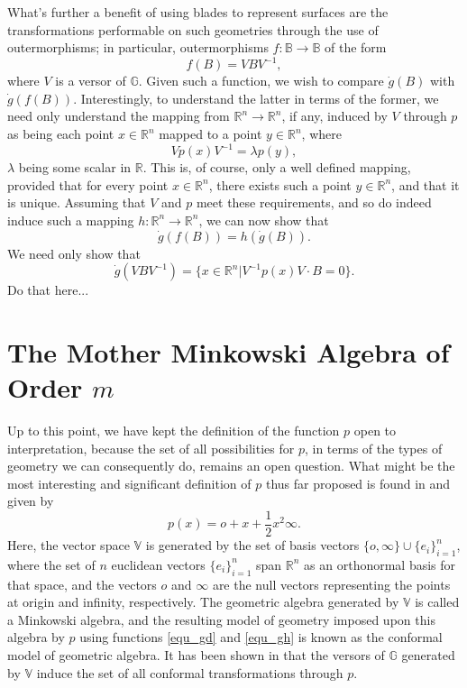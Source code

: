 \documentclass{ecgd-l}
\theoremstyle{definition}
\theoremstyle{remark}
\numberwithin{equation}{section}
\newcommand{\R}{\mathbb{R}}
\newcommand{\B}{\mathbb{B}}
\newcommand{\G}{\mathbb{G}}
\newcommand{\V}{\mathbb{V}}
\newcommand{\gd}{\dot{g}}
\newcommand{\nvai}{\infty}
\newcommand{\nvao}{o}
\begin{document}
What's further a benefit of using blades to represent surfaces are the transformations
performable on such geometries through the use of outermorphisms; in particular,
outermorphisms $f:\B\to\B$ of the form
\begin{equation*}
f(B) = VBV^{-1},
\end{equation*}
where $V$ is a versor of $\G$.  Given such a function, we wish to
compare $\gd(B)$ with $\gd(f(B))$.  Interestingly, to understand
the latter in terms of the former, we need only understand the mapping from $\R^n\to\R^n$,
if any, induced by $V$ through $p$ as being each point $x\in\R^n$ mapped to a point
$y\in\R^n$, where
\begin{equation*}
Vp(x)V^{-1}=\lambda p(y),
\end{equation*}
$\lambda$ being some scalar in $\R$.
This is, of course, only a well defined mapping, provided that for every point $x\in\R^n$, there exists
such a point $y\in\R^n$, and that it is unique.
Assuming that $V$ and $p$ meet these requirements, and so do indeed induce
such a mapping $h:\R^n\to\R^n$, we can now show that
\begin{equation*}
\gd(f(B)) = h(\gd(B)).
\end{equation*}
We need only show that
\begin{equation*}
\gd(VBV^{-1})=\{x\in\R^n|V^{-1}p(x)V\cdot B=0\}.
\end{equation*}
Do that here...

\section{The Mother Minkowski Algebra of Order $m$}

Up to this point, we have kept the definition of the function $p$
open to interpretation, because the set of all possibilities for $p$, in terms of the types of geometry
we can consequently do, remains an open question.  What might be the most interesting and significant
definition of $p$ thus far proposed is found in \cite{} and given by
\begin{equation*}
p(x)=\nvao + x + \frac{1}{2}x^2\nvai.
\end{equation*}
Here, the vector space $\V$ is generated by the set
of basis vectors $\{\nvao,\nvai\}\cup\{e_i\}_{i=1}^n$,
where the set of $n$ euclidean vectors $\{e_i\}_{i=1}^n$ span
$\R^n$ as an orthonormal basis for that space, and the
vectors $\nvao$ and $\nvai$ are the null vectors representing the
points at origin and infinity, respectively.  The geometric
algebra generated by $\V$ is called a Minkowski algebra, and the resulting model of
geometry imposed upon this algebra by $p$ using functions \eqref{equ_gd} and \eqref{equ_gh}
is known as the conformal model of geometric algebra.  It has been shown in \cite{} that
the versors of $\G$ generated by $\V$ induce the set of all conformal transformations through $p$.
\end{document}
